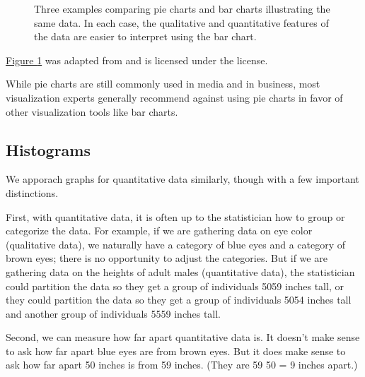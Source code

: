 \documentclass[letterpaper,10pt,english]{jupyterBook}
\begin{document}
\begin{figure}[htbp]
\centering
\capstart

\noindent{}
\caption{Three examples comparing pie charts and bar charts illustrating the same data. In each case, the qualitative and quantitative features of the data are easier to interpret using the bar chart.\sphinxfootnotemark[1]}\label{\detokenize{Ch1 Sampling and Data/1.4 Tables and Charts:pie-vs-bar}}\end{figure}
%
\begin{footnotetext}[1]\sphinxAtStartFootnote
\hyperref[\detokenize{Ch1 Sampling and Data/1.4 Tables and Charts:pie-vs-bar}]{Figure \ref{\detokenize{Ch1 Sampling and Data/1.4 Tables and Charts:pie-vs-bar}}} was adapted from  and is licensed under the  license.
%
\end{footnotetext}\ignorespaces 
\sphinxAtStartPar
While pie charts are still commonly used in media and in business, most visualization experts generally recommend against using pie charts in favor of other visualization tools like bar charts.


\subsection{Histograms}
\label{\detokenize{Ch1 Sampling and Data/1.4 Tables and Charts:histograms}}
\sphinxAtStartPar
We apporach graphs for quantitative data similarly, though with a few important distinctions.

\sphinxAtStartPar
First, with quantitative data, it is often up to the statistician how to group or categorize the data. For example, if we are gathering data on eye color (qualitative data), we naturally have a category of blue eyes and a category of brown eyes; there is no opportunity to adjust the categories. But if we are gathering data on the heights of adult males (quantitative data), the statistician could partition the data so they get a group of individuals 50\sphinxhyphen{}59 inches tall, or they could partition the data so they get a group of individuals 50\sphinxhyphen{}54 inches tall and another group of individuals 55\sphinxhyphen{}59 inches tall.

\sphinxAtStartPar
Second, we can measure how far apart quantitative data is. It doesn’t make sense to ask how far apart blue eyes are from brown eyes. But it does make sense to ask how far apart 50 inches is from 59 inches. (They are 59 \sphinxhyphen{} 50 = 9 inches apart.)
\end{document}
